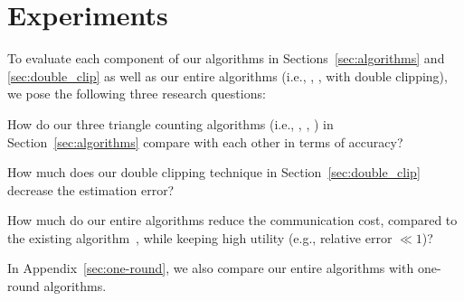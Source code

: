 \section{Experiments}
\label{sec:experiments}

To evaluate each component of our algorithms in Sections~\ref{sec:algorithms} and \ref{sec:double_clip} as well as our entire algorithms (i.e., \AlgOne, \AlgTwo, \AlgThree with double clipping), we pose the following three research questions:
\begin{description}[leftmargin=9.75mm]
    \item[RQ1.] 
    How do our three triangle counting algorithms 
    (i.e., \AlgOne, \AlgTwo, \AlgThree) in Section~\ref{sec:algorithms} compare with each other in terms of accuracy?
    \item[RQ2.] 
    How much does our double clipping technique in Section~\ref{sec:double_clip} decrease the estimation error?
    \item[RQ3.] 
    How much do our entire algorithms reduce the communication cost, compared to the existing algorithm~\cite{Imola_USENIX21}, while keeping high utility (e.g., relative error $\ll 1$)?
\end{description}
In Appendix~\ref{sec:one-round}, we also compare our entire algorithms with one-round algorithms.



